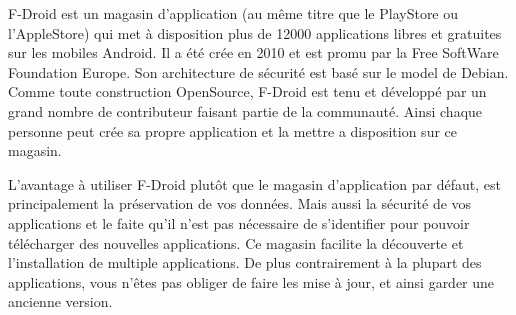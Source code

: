 F-Droid est un magasin d'application (au même titre que le PlayStore ou l'AppleStore) qui met à disposition plus de 12000 applications libres et gratuites sur les mobiles Android.
Il a été crée en 2010 et est promu par la Free SoftWare Foundation Europe. Son architecture de sécurité est basé sur le model de Debian.
Comme toute construction OpenSource, F-Droid est tenu et développé par un grand nombre de contributeur faisant partie de la communauté. 
Ainsi chaque personne peut crée sa propre application et la mettre a disposition sur ce magasin.

L’avantage à utiliser F-Droid plutôt que le magasin d'application par défaut, est principalement la préservation de vos données. Mais aussi la sécurité de vos applications et le faite qu'il n'est pas nécessaire de s'identifier pour pouvoir télécharger des nouvelles applications. 
Ce magasin facilite la découverte et l'installation de multiple applications. De plus contrairement à la plupart des applications, vous n’êtes pas obliger de faire les mise à jour, et ainsi garder une ancienne version. 
